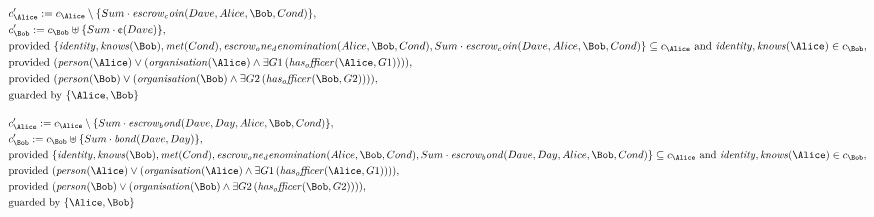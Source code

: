 \begin{align*}
&
c'_
{
\Alice
}
 := 
c_
{
\Alice
}
 \setminus 
\{
Sum
\cdot
\mathit{
escrow_coin
}
(
Dave
,
Alice
,
\Bob
,
Cond
)
\}
,\\
&
c'_
{
\Bob
}
 := 
c_
{
\Bob
}
 \uplus 
\{
Sum
\cdot
\text{\textcent}
(
Dave
)
\}
,\\
&
\text{provided } 
\{
\mathit{
identity
}
,
\mathit{
knows
}
(
\Bob
)
,
\mathit{
met
}
(
Cond
)
,
\mathit{
escrow_one_denomination
}
(
Alice
,
\Bob
,
Cond
)
,
Sum
\cdot
\mathit{
escrow_coin
}
(
Dave
,
Alice
,
\Bob
,
Cond
)
\}
 \subseteq c_
{
\Alice
}
 \text{ and } 
\mathit{
identity
}
,
\mathit{
knows
}
(
\Alice
)
 \in c_
{
\Bob
}
,\\
&
\text{provided } 
(
\mathit{
person
}
(
\Alice
)
\lor
(
\mathit{
organisation
}
(
\Alice
)
\land
\exists 
G1
\,(
\mathit{
has_officer
}
(
\Alice
,
G1
)
)
)
)
,\\
&
\text{provided } 
(
\mathit{
person
}
(
\Bob
)
\lor
(
\mathit{
organisation
}
(
\Bob
)
\land
\exists 
G2
\,(
\mathit{
has_officer
}
(
\Bob
,
G2
)
)
)
)
,\\
&
\text{guarded by } \{
\Alice
,
\Bob
\}
\end{align*}

\begin{align*}
&
c'_
{
\Alice
}
 := 
c_
{
\Alice
}
 \setminus 
\{
Sum
\cdot
\mathit{
escrow_bond
}
(
Dave
,
Day
,
Alice
,
\Bob
,
Cond
)
\}
,\\
&
c'_
{
\Bob
}
 := 
c_
{
\Bob
}
 \uplus 
\{
Sum
\cdot
\mathit{
bond
}
(
Dave
,
Day
)
\}
,\\
&
\text{provided } 
\{
\mathit{
identity
}
,
\mathit{
knows
}
(
\Bob
)
,
\mathit{
met
}
(
Cond
)
,
\mathit{
escrow_one_denomination
}
(
Alice
,
\Bob
,
Cond
)
,
Sum
\cdot
\mathit{
escrow_bond
}
(
Dave
,
Day
,
Alice
,
\Bob
,
Cond
)
\}
 \subseteq c_
{
\Alice
}
 \text{ and } 
\mathit{
identity
}
,
\mathit{
knows
}
(
\Alice
)
 \in c_
{
\Bob
}
,\\
&
\text{provided } 
(
\mathit{
person
}
(
\Alice
)
\lor
(
\mathit{
organisation
}
(
\Alice
)
\land
\exists 
G1
\,(
\mathit{
has_officer
}
(
\Alice
,
G1
)
)
)
)
,\\
&
\text{provided } 
(
\mathit{
person
}
(
\Bob
)
\lor
(
\mathit{
organisation
}
(
\Bob
)
\land
\exists 
G2
\,(
\mathit{
has_officer
}
(
\Bob
,
G2
)
)
)
)
,\\
&
\text{guarded by } \{
\Alice
,
\Bob
\}
\end{align*}

